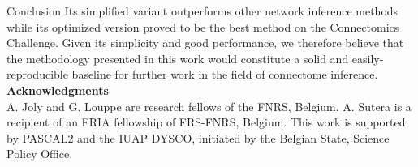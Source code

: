\documentclass[final]{beamer}
\begin{document}
\begin{frame}{}
\begin{textblock}{0.32}
\begin{block}{Conclusion \phantom{p}}
Its simplified variant outperforms other
network inference methods while its optimized version proved to be the best method
on the Connectomics Challenge. Given its simplicity and good performance, we
therefore believe that the methodology presented in this work
would constitute a solid and easily-reproducible baseline for further work in
the field of connectome inference.\\[2ex]

\textbf{Acknowledgments}\\
A. Joly and G. Louppe are research fellows of the FNRS, Belgium.  A. Sutera is a
recipient of an FRIA fellowship of FRS-FNRS, Belgium. This work is supported by
PASCAL2 and the IUAP DYSCO, initiated by the Belgian State, Science Policy
Office.


\end{block}

\end{textblock}

\end{frame}
\end{document}
